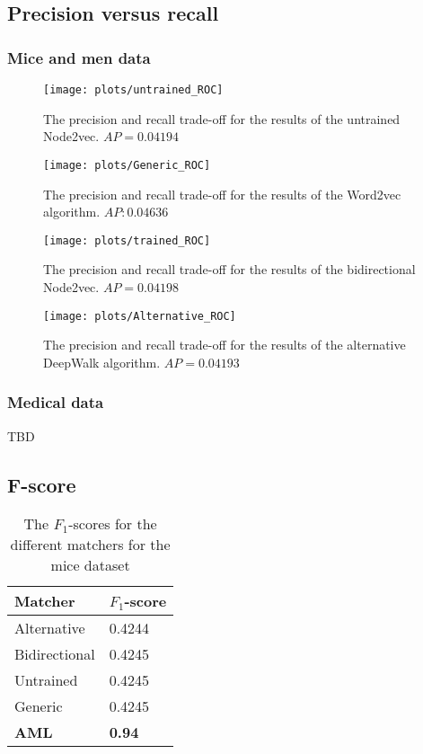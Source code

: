 \documentclass{article}
\begin{document}
 \subsection{Precision versus recall}
  \subsubsection{Mice and men data}
  \begin{figure}[H]
   \centering
   \texttt{[image: plots/untrained\_ROC]}
   \caption{The precision and recall trade-off for the results of the untrained Node2vec. $AP = 0.04194$}
   \label{ROC_untrained}
  \end{figure}
 
  \begin{figure}[H]
   \centering
   \texttt{[image: plots/Generic\_ROC]}
   \caption{The precision and recall trade-off for the results of the Word2vec algorithm. $AP: 0.04636$}
   \label{ROC_generic}
  \end{figure}
 
  \begin{figure}[H]
   \centering
   \texttt{[image: plots/trained\_ROC]}
   \caption{The precision and recall trade-off for the results of the bidirectional Node2vec. $AP = 0.04198$}
   \label{ROC_trained}
  \end{figure}
  
  \begin{figure}[H]
   \centering
   \texttt{[image: plots/Alternative\_ROC]}
   \caption{The precision and recall trade-off for the results of the alternative DeepWalk algorithm. $AP = 0.04193$}
   \label{ROC_alternative}
  \end{figure}
   \subsubsection{Medical data}
   TBD
  
  \subsection{F-score}
  \begin{table}[H]
  \begin{tabular}{l|l}
  \textbf{Matcher} & \textbf{$F_1$-score}\\
  \hline
  Alternative & 0.4244\\
  Bidirectional & 0.4245\\
  Untrained & 0.4245\\
  Generic & 0.4245\\
  \textbf{AML} & \textbf{0.94}\\ %
  \end{tabular}
  \caption{The $F_1$-scores for the different matchers for the mice dataset}
  \label{fscores}
  \end{table}
\end{document}

